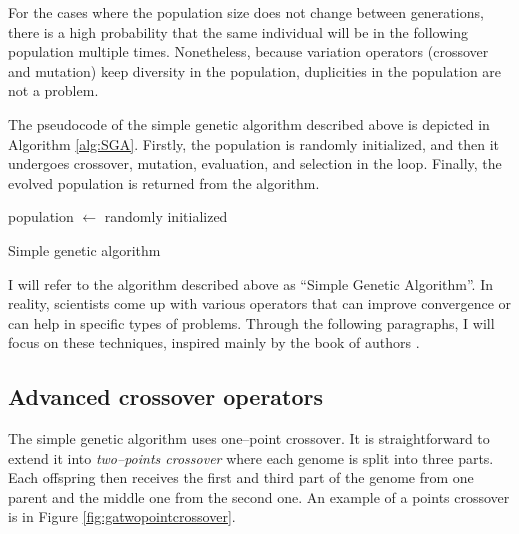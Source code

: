 For the cases where the population size does not change between generations, there is a high probability that the same individual will be in the following population multiple times. Nonetheless, because variation operators (crossover and mutation) keep diversity in the population, duplicities in the population are not a problem.

The pseudocode of the simple genetic algorithm described above is depicted in Algorithm \ref{alg:SGA}. Firstly, the population is randomly initialized, and then it undergoes crossover, mutation, evaluation, and selection in the loop. Finally, the evolved population is returned from the algorithm.

\begin{algorithm}
    population $\leftarrow$ randomly initialized\;
    \caption{Simple genetic algorithm}
    \label{alg:SGA}
\end{algorithm}

I will refer to the algorithm described above as \enquote{Simple Genetic Algorithm}. In reality, scientists come up with various operators that can improve convergence or can help in specific types of problems. Through the following paragraphs, I will focus on these techniques, inspired mainly by the book of authors \citet*{IntroToGA}.

\subsection{Advanced crossover operators}

The simple genetic algorithm uses one--point crossover. It is straightforward to extend it into \emph{two--points crossover} where each genome is split into three parts. Each offspring then receives the first and third part of the genome from one parent and the middle one from the second one. An example of a points crossover is in Figure \ref{fig:gatwopointcrossover}.


